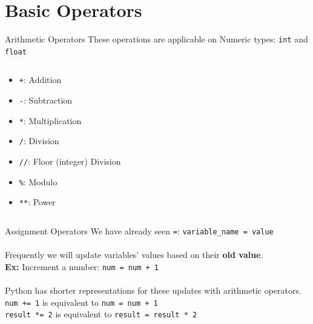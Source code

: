      \section{Basic Operators}
        \begin{frame}{Arithmetic Operators}
            \LARGE
            These operations are applicable on Numeric types: \texttt{int} and \texttt{float}
            \pause
            \begin{columns}
               \begin{column}{0.40\textwidth}
                \vspace{-5mm}
                \begin{itemize}
                    \item \texttt{+}: Addition
                    \pause
                    \item \texttt{-}: Subtraction
                    \pause
                    \item \texttt{*}: Multiplication
                    \pause
                    \item \texttt{/}: Division
                    \pause
                    \item \texttt{//}: Floor (integer) Division
                    \pause
                    \item \texttt{\%}: Modulo
                    \pause
                    \item \texttt{**}: Power
                \end{itemize}
               \end{column}
               \pause
               \begin{column}{0.65\textwidth}
                \inputminted[frame=single,framesep=2pt]{python3}{code-examples/numeric_operators.py}
               \end{column}
            \end{columns}
        \end{frame}

        \begin{frame}{Assignment Operators}
            \LARGE
            We have already seen \texttt{\textquotesingle=\textquotesingle}:
            \texttt{variable\_name = value}\\
            \pause
            \\
            Frequently we will update variables' values based on their \textbf{old value}.\\
            \textbf{Ex:} Increment a number: \texttt{num = num + 1}\\
            \pause
            \\
            Python has shorter representations for these updates with arithmetic operators.\\
            \pause
            \texttt{num += 1} is equivalent to \texttt{num = num + 1}\\
            \pause
            \texttt{result *= 2} is equivalent to \texttt{result = result * 2}\\
        \end{frame}

